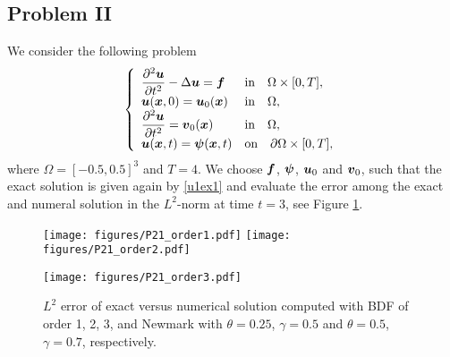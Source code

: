\documentclass[english,a4paper]{article}
\newcommand{\psibf}{\text{\mbox{\boldmath $\psi$}}}
\newcommand{\ubf}{\text{\mbox{\boldmath $u$}}}
\newcommand{\vbf}{\text{\mbox{\boldmath $v$}}}
\newcommand{\xbf}{\text{\mbox{\boldmath $x$}}}
\newcommand{\fbf}{\text{\mbox{\boldmath $f$}}}
\begin{document}
\subsection{Problem II}
We consider the following problem
\begin{equation}\label{ex2}
\left\{
\begin{array}{ll}
\displaystyle\frac{\partial^2 \ubf}{\partial t^2} -\Delta \ubf = \fbf & \text{in}\quad
\Omega\times [0,T],\\
\displaystyle\ubf(\xbf, 0) =  \ubf_0(\xbf)  & \text{in}\quad \Omega,\\
\displaystyle\frac{\partial^2 \ubf}{\partial t^2} =  \vbf_0(\xbf)  & \text{in}\quad \Omega,\\
\displaystyle\ubf(\xbf, t) = \psibf(\xbf, t)   & \text{on}\quad \partial\Omega\times[0,T],
\end{array}
\right.
\end{equation}
where $\Omega=[-0.5, 0.5]^3$ and $T=4$.
We choose $\fbf$, $\psibf$, $\ubf_0$ and $\vbf_0$, such that the exact solution
is given again by \eqref{u1ex1} and  evaluate the error
among the exact  and numeral solution in the $L^2$-norm  at
 time $t=3$, see Figure \ref{acc2}.
\begin{figure}[!h]
\centering
\texttt{[image: figures/P21\_order1.pdf]}
\centering
\texttt{[image: figures/P21\_order2.pdf]}
\end{figure}
\begin{figure}[!h]
\centering
\texttt{[image: figures/P21\_order3.pdf]}
\caption{$L^2$ error of exact versus numerical solution computed with
  BDF of order 1, 2, 3, and Newmark with
$\theta=0.25$, $\gamma=0.5$ and $\theta=0.5$, $\gamma=0.7$, respectively.  }\label{acc2}
\end{figure}
\clearpage
\newpage
\end{document}

